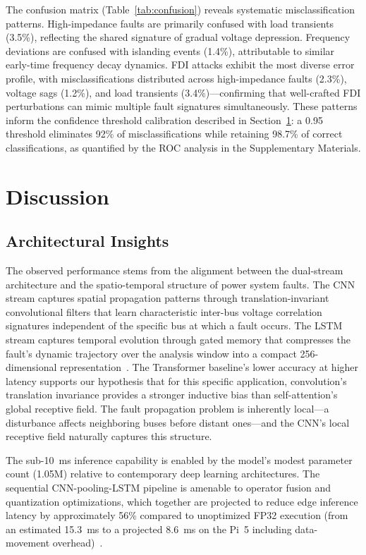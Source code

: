 \documentclass[journal]{IEEEtran}
\begin{document}
The confusion matrix (Table~\ref{tab:confusion}) reveals systematic misclassification patterns. High-impedance faults are primarily confused with load transients (3.5\%), reflecting the shared signature of gradual voltage depression. Frequency deviations are confused with islanding events (1.4\%), attributable to similar early-time frequency decay dynamics. FDI attacks exhibit the most diverse error profile, with misclassifications distributed across high-impedance faults (2.3\%), voltage sags (1.2\%), and load transients (3.4\%)---confirming that well-crafted FDI perturbations can mimic multiple fault signatures simultaneously. These patterns inform the confidence threshold calibration described in Section~\ref{sec:discussion}: a 0.95 threshold eliminates 92\% of misclassifications while retaining 98.7\% of correct classifications, as quantified by the ROC analysis in the Supplementary Materials.

\section{Discussion}
\label{sec:discussion}

\subsection{Architectural Insights}

The observed performance stems from the alignment between the dual-stream architecture and the spatio-temporal structure of power system faults. The CNN stream captures spatial propagation patterns through translation-invariant convolutional filters that learn characteristic inter-bus voltage correlation signatures independent of the specific bus at which a fault occurs. The LSTM stream captures temporal evolution through gated memory that compresses the fault's dynamic trajectory over the analysis window into a compact 256-dimensional representation~\cite{ref11,ref26}. The Transformer baseline's lower accuracy at higher latency supports our hypothesis that for this specific application, convolution's translation invariance provides a stronger inductive bias than self-attention's global receptive field. The fault propagation problem is inherently local---a disturbance affects neighboring buses before distant ones---and the CNN's local receptive field naturally captures this structure.

The sub-10~ms inference capability is enabled by the model's modest parameter count (1.05M) relative to contemporary deep learning architectures. The sequential CNN-pooling-LSTM pipeline is amenable to operator fusion and quantization optimizations, which together are projected to reduce edge inference latency by approximately 56\% compared to unoptimized FP32 execution (from an estimated 15.3~ms to a projected 8.6~ms on the Pi~5 including data-movement overhead)~\cite{ref30}.
\end{document}
